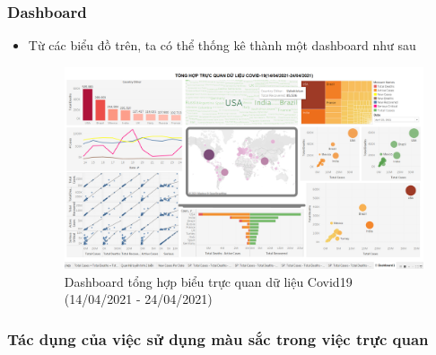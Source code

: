 \documentclass[a4paper, 12pt]{article}
\begin{document}
\subsubsection{Dashboard}

\begin{itemize}
    \item Từ các biểu đồ trên, ta có thể thống kê thành một dashboard như sau
    \begin{figure}[H]
        \begin{center}
            \includegraphics[scale=0.25]{img/dashboard1.png}
            \caption{Dashboard tổng hợp biểu trực quan dữ liệu Covid19 (14/04/2021 - 24/04/2021)}
        \end{center}
    \end{figure}
\end{itemize}

\subsubsection{Tác dụng của việc sử dụng màu sắc trong việc trực quan}
\end{document}
